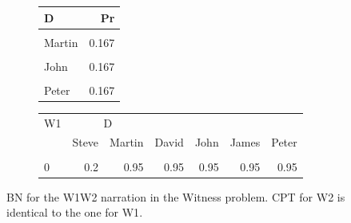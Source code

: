 \documentclass[
  10pt,
]{scrartcl}
\begin{document}
\begin{figure}[H]
 \hfill
\begin{subfigure}[!ht]{0.3\textwidth}
\begin{tabular}{lr}
\toprule
D & Pr\\
\midrule
\cellcolor{gray!6}{Steve} & \cellcolor{gray!6}{0.167}\\
Martin & 0.167\\
\cellcolor{gray!6}{David} & \cellcolor{gray!6}{0.167}\\
John & 0.167\\
\cellcolor{gray!6}{James} & \cellcolor{gray!6}{0.167}\\
Peter & 0.167\\
\bottomrule
\end{tabular}
\end{subfigure}
\centering
\begin{subfigure}[!ht]{0.3\textwidth}
\begin{tabular}{lrrrrrr}
\toprule
\multicolumn{1}{c}{W1} & \multicolumn{2}{c}{D} \\
  & Steve & Martin & David & John & James & Peter\\
\midrule
\cellcolor{gray!6}{1} & \cellcolor{gray!6}{0.8} & \cellcolor{gray!6}{0.05} & \cellcolor{gray!6}{0.05} & \cellcolor{gray!6}{0.05} & \cellcolor{gray!6}{0.05} & \cellcolor{gray!6}{0.05}\\
0 & 0.2 & 0.95 & 0.95 & 0.95 & 0.95 & 0.95\\
\bottomrule
\end{tabular}
\end{subfigure}
\caption{BN for the \textsf{W1W2} narration in the \textsf{Witness} problem. CPT for \textsf{W2} is identical to the one for \textsf{W1}.}
\label{fig:w1w2}
\end{figure}
\end{document}
